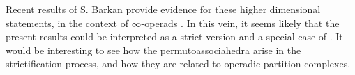 Recent results of S. Barkan provide evidence for these higher dimensional statements, in the context of $\infty$-operads \cite{barkanArityApproximationInfty2022}.
In this vein, it seems likely that the present results could be interpreted as a strict version and a special case of \cite[Theorem B]{barkanArityApproximationInfty2022}. 
It would be interesting to see how the permutoassociahedra arise in the strictification process, and how they are related to operadic partition complexes.  



